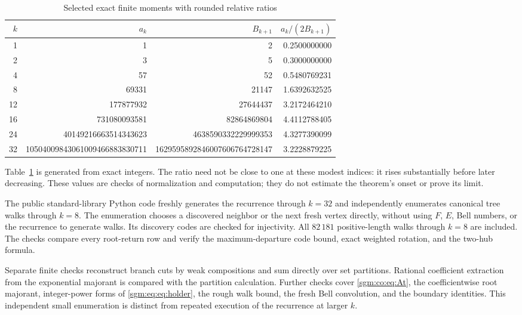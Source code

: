 \documentclass[11pt,letterpaper]{article}
\theoremstyle{remark}\newtheorem{remark}[theorem]{Remark}
\theoremstyle{definition}\newtheorem{definition}[theorem]{Definition}
\begin{document}
\begin{table}[htbp]
\centering\footnotesize\setlength{\tabcolsep}{4pt}
\caption{Selected exact finite moments with rounded relative ratios}
\label{sgm:eq:tab:moments}
\begin{tabular}{r r r r}
\toprule
$k$ & $a_k$ & $B_{k+1}$ & $a_k/(2B_{k+1})$ \\
\midrule
1 & 1 & 2 & 0.2500000000 \\
2 & 3 & 5 & 0.3000000000 \\
4 & 57 & 52 & 0.5480769231 \\
8 & 69331 & 21147 & 1.6392632525 \\
12 & 177877932 & 27644437 & 3.2172464210 \\
16 & 731080093581 & 82864869804 & 4.4112788405 \\
24 & 40149216663514343623 & 4638590332229999353 & 4.3277390099 \\
32 & 10504009843061009466883830711 & 1629595892846007606764728147 & 3.2228879225 \\
\bottomrule
\end{tabular}
\end{table}
Table~\ref{sgm:eq:tab:moments} is generated from exact integers. The ratio need not be close to one at these modest indices: it rises substantially before later decreasing. These values are checks of normalization and computation; they do not estimate the theorem's onset or prove its limit.

The public standard-library Python code freshly generates the recurrence through $k=32$ and independently enumerates canonical tree walks through $k=8$. The enumeration chooses a discovered neighbor or the next fresh vertex directly, without using $F$, $E$, Bell numbers, or the recurrence to generate walks. Its discovery codes are checked for injectivity. All $82\,181$ positive-length walks through $k=8$ are included. The checks compare every root-return row and verify the maximum-departure code bound, exact weighted rotation, and the two-hub formula.

Separate finite checks reconstruct branch cuts by weak compositions and sum directly over set partitions. Rational coefficient extraction from the exponential majorant is compared with the partition calculation. Further checks cover \eqref{sgm:co:eq:At}, the coefficientwise root majorant, integer-power forms of \eqref{sgm:eq:eq:holder}, the rough walk bound, the fresh Bell convolution, and the boundary identities. This independent small enumeration is distinct from repeated execution of the recurrence at larger $k$.
\end{document}
